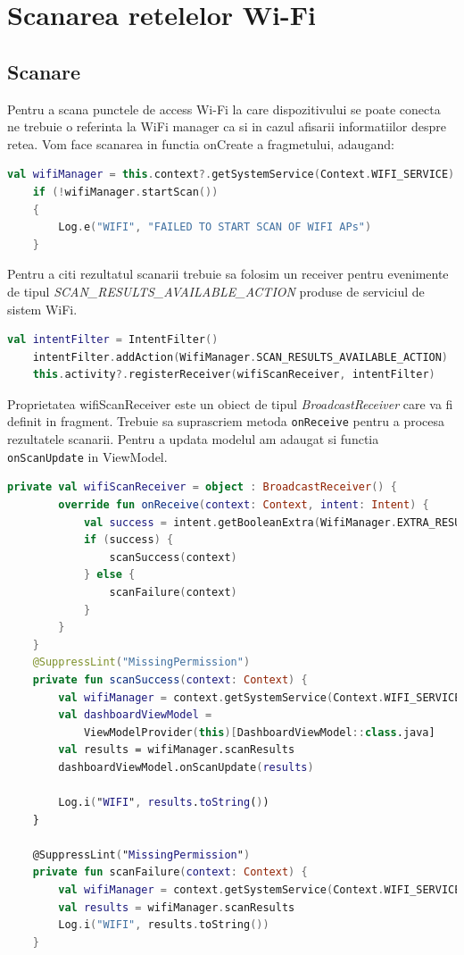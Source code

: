 \section{Scanarea retelelor Wi-Fi}
\subsection{Scanare}
Pentru a scana punctele de access Wi-Fi la care dispozitivului se poate conecta ne trebuie o referinta la WiFi manager ca si in cazul afisarii informatiilor despre retea.
Vom face scanarea in functia onCreate a fragmetului, adaugand:

\begin{lstlisting}[language=Kotlin]
    val wifiManager = this.context?.getSystemService(Context.WIFI_SERVICE) as WifiManager;
    if (!wifiManager.startScan())
    {
        Log.e("WIFI", "FAILED TO START SCAN OF WIFI APs")
    }
\end{lstlisting}

Pentru a citi rezultatul scanarii trebuie sa folosim un receiver pentru evenimente de
tipul \textit{SCAN\_RESULTS\_AVAILABLE\_ACTION} produse de serviciul de sistem WiFi.

\begin{lstlisting}[language=Kotlin]
    val intentFilter = IntentFilter()
    intentFilter.addAction(WifiManager.SCAN_RESULTS_AVAILABLE_ACTION)
    this.activity?.registerReceiver(wifiScanReceiver, intentFilter)
\end{lstlisting}

Proprietatea wifiScanReceiver este un obiect de tipul \textit{BroadcastReceiver} care va fi definit in fragment.
Trebuie sa suprascriem metoda \texttt{onReceive} pentru a procesa rezultatele scanarii.
Pentru a updata modelul am adaugat si functia \texttt{onScanUpdate} in ViewModel.

\begin{lstlisting}[language=Kotlin]
    private val wifiScanReceiver = object : BroadcastReceiver() {
        override fun onReceive(context: Context, intent: Intent) {
            val success = intent.getBooleanExtra(WifiManager.EXTRA_RESULTS_UPDATED, false)
            if (success) {
                scanSuccess(context)
            } else {
                scanFailure(context)
            }
        }
    }
    @SuppressLint("MissingPermission")
    private fun scanSuccess(context: Context) {
        val wifiManager = context.getSystemService(Context.WIFI_SERVICE) as WifiManager
        val dashboardViewModel =
            ViewModelProvider(this)[DashboardViewModel::class.java]
        val results = wifiManager.scanResults
        dashboardViewModel.onScanUpdate(results)

        Log.i("WIFI", results.toString())
    }

    @SuppressLint("MissingPermission")
    private fun scanFailure(context: Context) {
        val wifiManager = context.getSystemService(Context.WIFI_SERVICE) as WifiManager
        val results = wifiManager.scanResults
        Log.i("WIFI", results.toString())
    }
\end{lstlisting}
